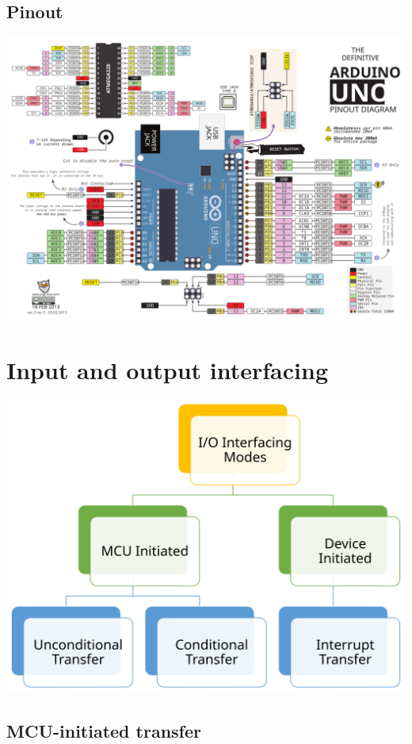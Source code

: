 \documentclass[11pt]{article}
\begin{document}
\subsection{Pinout}
\label{sec:orgdd1162a}
\begin{center}
\includegraphics[width=.9\linewidth]{./images/arduino-uno-pinout.png}
\end{center}

 \newpage
\section{Input and output interfacing}
\label{sec:org4c222ef}
\begin{center}
\includegraphics[width=.9\linewidth]{./images/input-and-output-interfacing-diagram.png}
\end{center}
\subsection{MCU-initiated transfer}
\label{sec:org9a995ee}
\end{document}
